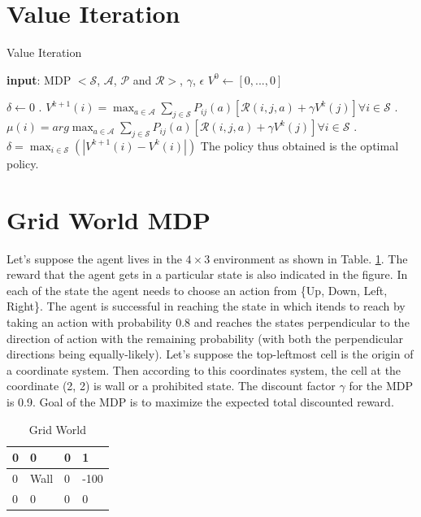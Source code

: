 \documentclass{article}
\begin{document}
\section{Value Iteration}
\begin{algorithm}[H]
    \caption{Value Iteration}\label{value_iteration}
    \begin{algorithmic}
        \State \textbf{input}: MDP $<\mathcal{S}$, $\mathcal{A}$, $\mathcal{P}$ and $\mathcal{R}>$, $\gamma$, $\epsilon$
        \State $V^{0} \gets [0,..., 0]$

        \While{$\delta >= \epsilon$}
            \State $\delta \gets 0$
            . $V^{k+1}(i) = \max_{a \in \mathcal{A}}\sum_{j \in \mathcal{S}} P_{ij}(a) [\mathcal{R}(i, j, a) + \gamma V^{k}(j)] \forall i \in \mathcal{S}$
            . $\mu(i) = arg \max_{a \in \mathcal{A}}\sum_{j \in \mathcal{S}} P_{ij}(a) [\mathcal{R}(i, j, a) + \gamma V^{k}(j)] \forall i \in \mathcal{S}$
            . $\delta = \max_{i \in \mathcal{S}}(|V^{k+1}(i) - V^{k}(i)|)$
        \EndWhile
        \State The policy thus obtained is the optimal policy.
    \end{algorithmic}
\end{algorithm}

\section{Grid World MDP}
Let's suppose the agent lives in the $4 \times 3$ environment as shown in Table. \ref{grid_world}. The reward that the agent gets in a particular
state is also indicated in the figure. In each of the state the agent needs to choose an action from \{Up, Down, Left, Right\}. The
agent is successful in reaching the state in which itends to reach by taking an action with probability 0.8 and reaches the states
perpendicular to the direction of action with the remaining probability (with both the perpendicular directions being equally-likely).
Let's suppose the top-leftmost cell is the origin of a coordinate system. Then according to this coordinates system, the cell at 
the coordinate (2, 2) is wall or a prohibited state. The discount factor $\gamma$ for the MDP is 0.9. Goal of the MDP is to 
maximize the expected total discounted reward.

\begin{table}[H]
    \begin{center}
    \renewcommand{\arraystretch}{2}
    \begin{tabular}{ | m{1cm} | m{1cm}| m{1cm} | m{1cm} | } 
      \hline
      0 & 0 & 0 & \cellcolor{green!25}1 \\ 
      \hline
      0 & \cellcolor{gray!50}Wall & 0 & \cellcolor{red!25}-100 \\ 
      \hline
      0 & 0 & 0 & 0 \\ 
      \hline
    \end{tabular}
    \caption{Grid World}
    \label{grid_world}
    \renewcommand{\arraystretch}{1}
\end{center}
\end{table}
	
\end{document}
